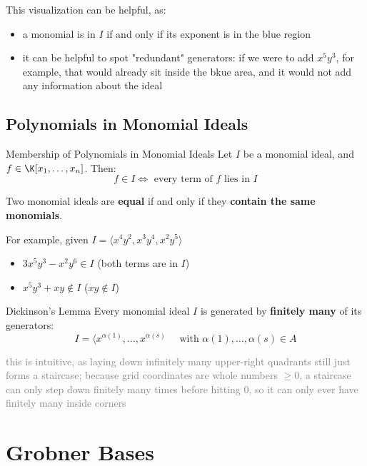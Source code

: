 \documentclass[a4paper, 11pt]{report}
\begin{document}
This visualization can be helpful, as:
\begin{itemize}
    \item a monomial is in $I$ if and only if its exponent is in the blue region
    \item it can be helpful to spot "redundant" generators: if we were to add $x^{5}y^{3}$, for example, that would already sit inside the bkue area, and it would not add any information about the ideal
\end{itemize}

\subsection{Polynomials in Monomial Ideals}

\begin{thmframe}{Membership of Polynomials in Monomial Ideals}{}
    Let $I$ be a monomial ideal, and $f \in \K[x_1, \dots , x_{n}]$. Then:
    $$ f \in I \iff \text{ every term of } f \text{ lies in } I $$
\end{thmframe}

\begin{corframe}{}
    Two monomial ideals are \textbf{equal} if and only if they \textbf{contain the same monomials}.
\end{corframe}

For example, given $I = \langle x^{4}y^{2}, x^{3}y^{4}, x^{2}y^{5} \rangle$
\begin{itemize}
    \item $3x^{5}y^{3} - x^{2}y^{6} \in I$ (both terms are in $I$)
    \item $x^{5}y^{3} + xy \not \in I$ ($xy \not \in I$)
\end{itemize}

\begin{thmframe}{Dickinson's Lemma}{}
    Every monomial ideal $I$ is generated by \textbf{finitely many} of its generators:
    $$ I = \langle x^{\alpha(1)}, \dots , x^{\alpha(s)} \quad \text{ with } \alpha(1), \dots , \alpha(s) \in A$$

\textcolor{gray}{this is intuitive, as laying down infinitely many upper-right quadrants still just forms a staircase; because grid coordinates are whole numbers $\ge 0$, a staircase can only step down finitely many times before hitting $0$, so it can only ever have finitely many inside corners}
\end{thmframe}

\section{Grobner Bases}
\end{document}
